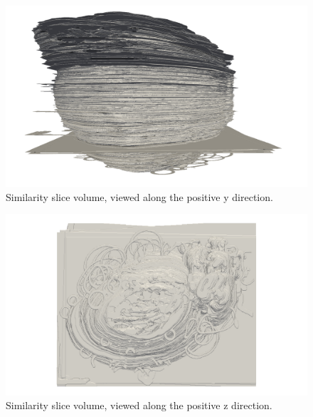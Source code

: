 	\begin{figure}
	  \centering
	  \includegraphics[width=0.9\textheight]{Ch6/Figs/Rat28/contours/whole_positive_y_size}
	  \caption{Similarity slice volume, viewed along the positive y direction.}
	  \label{fig:positive_y_similarity_contour}
	\end{figure}

	\begin{figure}
	  \centering
	  \includegraphics[width=0.9\textheight]{Ch6/Figs/Rat28/contours/whole_positive_z_size}
	  \caption{Similarity slice volume, viewed along the positive z direction.}
	  \label{fig:positive_z_similarity_contour}
	\end{figure}

